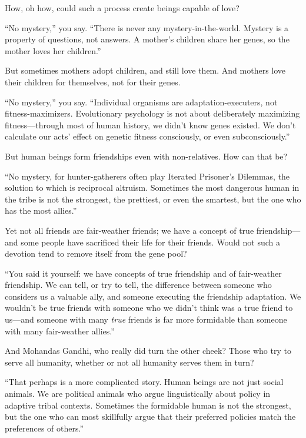 {
 How, oh how, could such a process create beings capable of love?}

{
 ``No mystery,'' you say.
``There is never any mystery-in-the-world. Mystery is
a property of questions, not answers. A mother's
children share her genes, so the mother loves her
children.''}

{
 But sometimes mothers adopt children, and still love them. And
mothers love their children for themselves, not for their genes.}

{
 ``No mystery,'' you say.
``Individual organisms are adaptation-executers, not
fitness-maximizers. Evolutionary psychology is not about deliberately
maximizing fitness---through most of human history, we
didn't know genes existed. We don't
calculate our acts' effect on genetic fitness
consciously, or even subconsciously.''}

{
 But human beings form friendships even with non-relatives. How can
that be?}

{
 ``No mystery, for hunter-gatherers often play
Iterated Prisoner's Dilemmas, the solution to which is
reciprocal altruism. Sometimes the most dangerous human in the tribe is
not the strongest, the prettiest, or even the smartest, but the one who
has the most allies.''}

{
 Yet not all friends are fair-weather friends; we have a concept of
true friendship---and some people have sacrificed their life for their
friends. Would not such a devotion tend to remove itself from the gene
pool?}

{
 ``You said it yourself: we have concepts of true
friendship and of fair-weather friendship. We can tell, or try to tell,
the difference between someone who considers us a valuable ally, and
someone executing the friendship adaptation. We
wouldn't be true friends with someone who we
didn't think was a true friend to us---and someone with
many \textit{true} friends is far more formidable than someone with
many fair-weather allies.''}

{
 And Mohandas Gandhi, who really did turn the other cheek? Those
who try to serve all humanity, whether or not all humanity serves them
in turn?}

{
 ``That perhaps is a more complicated story. Human
beings are not just social animals. We are political animals who argue
linguistically about policy in adaptive tribal contexts. Sometimes the
formidable human is not the strongest, but the one who can most
skillfully argue that their preferred policies match the preferences of
others.''}


